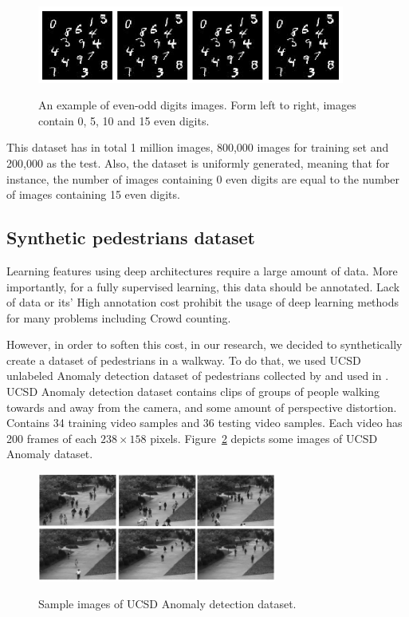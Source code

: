 \begin{figure}[H]
	\centering
	{\includegraphics[width=0.9\textwidth]{images/l2cmnist}}
		\caption{An example of even-odd digits images. Form left to right, images contain 0, 5, 10 and 15 even digits.}
	\label{fig:l2cmnist}
\end{figure}

\indent This dataset has in total 1 million images, 800,000 images for training set and 200,000 as the test. Also, the dataset is uniformly generated, meaning that for instance, the number of images containing 0 even digits are equal to the number of images containing 15 even digits.  

\subsection{Synthetic pedestrians dataset}
\label{subsec:synped}
Learning features using deep architectures require a large amount of data. More importantly, for a fully supervised learning, this data should be annotated. Lack of data or its' High annotation cost prohibit the usage of deep learning methods for many problems including Crowd counting. 

\indent However, in order to soften this cost, in our research, we decided to synthetically create a dataset of pedestrians in a walkway. To do that, we used UCSD unlabeled Anomaly detection dataset of pedestrians collected by \citeauthor{chan2008privacy} and used in \cite{chan2009analysis, mahadevan2010anomaly, li2014anomaly}. UCSD Anomaly detection dataset contains clips of groups of people walking towards and away from the camera, and some amount of perspective distortion. Contains 34 training video samples and 36 testing video samples. Each video has 200 frames of each $238\times158$ pixels. Figure~\ref{fig:anomaly} depicts some images of UCSD Anomaly dataset.

\begin{figure}[H]
	\centering
	{\includegraphics[width=0.7\textwidth]{images/anomaly}}
	\caption{Sample images of UCSD Anomaly detection dataset.}
	\label{fig:anomaly}
\end{figure}


